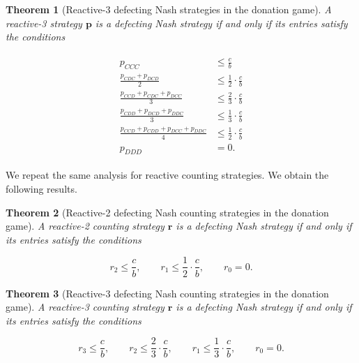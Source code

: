 \documentclass[11pt]{article}
\theoremstyle{plainCl1}
\newtheorem{theorem}{Theorem}
\theoremstyle{plainCl2}
\begin{document}
\begin{theorem}[Reactive-3 defecting Nash strategies in the donation game]
\label{theorem:reactive_three_defecting_strategies}
A reactive-3 strategy $\mathbf{p}$ is a defecting Nash strategy if and only if
its entries satisfy the conditions

\begin{align}\label{eq:defecting_conditions_three}
  \begin{split}
  p_{CCC} & \le \frac{c}{b} \\
  \frac{p_{CDC} + p_{DCD}}{2} & \leq \frac{1}{2} \cdot \frac{c}{b} \\
  \frac{p_{CCD} + p_{CDC} + p_{DCC}}{3} & \leq \frac{2}{3} \cdot \frac{c}{b} \\
  \frac{p_{CDD} + p_{DCD} + p_{DDC}}{3} & \leq \frac{1}{3} \cdot \frac{c}{b} \\
  \frac{p_{CCD} + p_{CDD} + p_{DCC} + p_{DDC}}{4}  & \leq \frac{1}{2} \cdot \frac{c}{b}  \\
  p_{DDD} & = 0.
  \end{split}
\end{align}

\end{theorem}

We repeat the same analysis for reactive counting strategies. We obtain the
following results.


\begin{theorem}[Reactive-2 defecting Nash counting strategies in the donation game]
\label{theorem:reactive_two_defecting_counting_strategies}
A reactive-2 counting strategy $\mathbf{r}$ is a defecting Nash strategy if and only if
its entries satisfy the conditions

\begin{equation}\label{eq:defecting_conditions_two_counting}
  r_{2} \le \frac{c}{b}, \qquad \displaystyle r_{1} \le \frac{1}{2} \cdot \frac{c}{b}, \qquad r_{0} = 0.
\end{equation}
\end{theorem}


\begin{theorem}[Reactive-3 defecting Nash counting strategies in the donation game]
\label{theorem:reactive_three_defecting_counting_strategies}
A reactive-3 counting strategy $\mathbf{r}$ is a defecting Nash strategy if and only if
its entries satisfy the conditions

\begin{equation}\label{eq:defecting_conditions_three_counting}
  r_{3} \le \frac{c}{b}, \qquad r_{2} \leq\frac{2}{3} \cdot \frac{c}{b}, \qquad
  r_{1} \leq\frac{1}{3} \cdot \frac{c}{b}, \qquad
  r_{0} = 0.
\end{equation}

\end{theorem}
\end{document}
